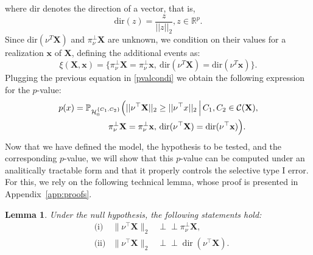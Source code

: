 \documentclass[a4paper,11pt]{article}
\theoremstyle{plain}
\newcommand{\norm}[1]{||#1||}
\newcommand{\1}{\mathbf{1}}
\newcommand{\projnu}{\pi_{\nu}^{\perp}}
\newcommand{\indep}{\perp \!\!\! \perp}
\newtheorem{lemma}{Lemma}
\begin{document}
where dir denotes the direction of a vector, that is,
\begin{equation}
  \text{dir}(z) = \frac{z}{\norm{z}_2}, z \in \mathbb{R}^p.
\end{equation}
Since $\text{dir}(\nu^T \mathbf{X})$ and $\projnu \mathbf{X}$ are unknown, we condition on their values for a realization $\mathbf{x}$ of $\mathbf{X}$, defining the additional events as:
\begin{equation*}
  \xi(\mathbf{X},\mathbf{x}) = \bigl\{ \projnu \mathbf{X} = \projnu \mathbf{x}, ~ \text{dir}(\nu^T \mathbf{X}) = \text{dir}(\nu^T \mathbf{x})\bigr\}.
\end{equation*}
Plugging the previous equation in \eqref{pvalcondi} we obtain the following expression for the $p$-value:
\begin{equation}\label{pval_final}
  \begin{aligned}
p(x) &= \mathbb{P}_{\mathcal{H}_0^{\{C_1,C_2\}}} \Bigl(
    \norm{\nu^\top \mathbf{X}}_2 \geq \norm{\nu^\top x}_2 
    \,\Big|\,
    C_1,C_2 \in \mathcal{C}(\mathbf{X}), \\ 
&\qquad\qquad
    \projnu \mathbf{X} = \projnu \mathbf{x},\,
    \text{dir}(\nu^\top \mathbf{X}) = \text{dir}(\nu^\top \mathbf{x})
\Bigr).
\end{aligned}
\end{equation}
Now that we have defined the model, the hypothesis to be tested, and the corresponding $p$-value, we will show that this $p$-value can be computed under an analitically tractable form and that it properly controls the selective type I error. For this, we rely on the following technical lemma, whose proof is presented in Appendix~\ref{app:proofs}.
\begin{lemma}\label{lemma_indep_add_events}
Under the null hypothesis, the following statements hold:
\[
  \begin{aligned}
  &\text{(i)} & \|\nu^\top \mathbf{X}\|_2 &\indep \projnu \mathbf{X},\\
  &\text{(ii)} & \|\nu^\top \mathbf{X}\|_2 &\indep \operatorname{dir}(\nu^\top \mathbf{X}).
\end{aligned}
\]
\end{lemma}
\end{document}

